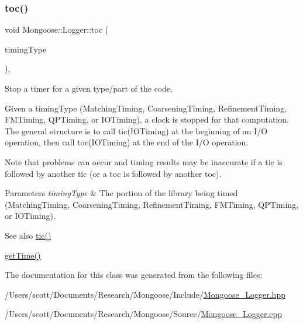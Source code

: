 \subsubsection{\texorpdfstring{toc()}{toc()}}
{\footnotesize\ttfamily void Mongoose\+::\+Logger\+::toc (\begin{DoxyParamCaption}\item[{Timing\+Type}]{timing\+Type }\end{DoxyParamCaption})\hspace{0.3cm}{\ttfamily [inline]}, {\ttfamily [static]}}



Stop a timer for a given type/part of the code. 

Given a timing\+Type (Matching\+Timing, Coarsening\+Timing, Refinement\+Timing, F\+M\+Timing, Q\+P\+Timing, or I\+O\+Timing), a clock is stopped for that computation. The general structure is to call tic(\+I\+O\+Timing) at the beginning of an I/O operation, then call toc(\+I\+O\+Timing) at the end of the I/O operation.

Note that problems can occur and timing results may be inaccurate if a tic is followed by another tic (or a toc is followed by another toc).


\begin{DoxyParams}{Parameters}
{\em timing\+Type} & The portion of the library being timed (Matching\+Timing, Coarsening\+Timing, Refinement\+Timing, F\+M\+Timing, Q\+P\+Timing, or I\+O\+Timing).\\
\hline
\end{DoxyParams}
\begin{DoxySeeAlso}{See also}
\hyperlink{class_mongoose_1_1_logger_afaa4ac7914bc5536fbe765ad2b4806d8}{tic()} 

\hyperlink{class_mongoose_1_1_logger_a9f74771ff530c41f98ee090f3a1897eb}{get\+Time()} 
\end{DoxySeeAlso}


The documentation for this class was generated from the following files\+:\begin{DoxyCompactItemize}
\item 
/\+Users/scott/\+Documents/\+Research/\+Mongoose/\+Include/\hyperlink{_mongoose___logger_8hpp}{Mongoose\+\_\+\+Logger.\+hpp}\item 
/\+Users/scott/\+Documents/\+Research/\+Mongoose/\+Source/\hyperlink{_mongoose___logger_8cpp}{Mongoose\+\_\+\+Logger.\+cpp}\end{DoxyCompactItemize}
